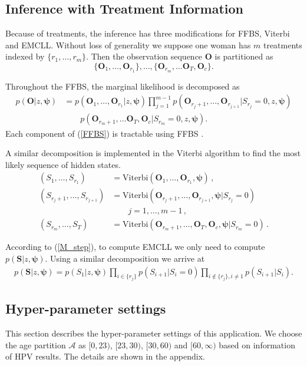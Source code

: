 \documentclass{article}
\begin{document}
\subsection{Inference with Treatment Information}
Because of treatments, the inference has three modifications for FFBS, Viterbi and EMCLL. Without loss of generality we suppose one woman has $m$ treatments indexed by $\{r_1, \ldots, r_m\}$. Then the observation sequence $\bm O$ is partitioned as 
$$\{\bm O_1, \ldots, \bm O_{r_1}\}, \ldots, \{\bm O_{r_m}, \ldots \bm O_T, \bm O_{c} \}.$$

Throughout the FFBS, the marginal likelihood is decomposed as
\begin{align}
p(\bm O |z, \bm \psi) & = p(\bm O_1, \ldots, \bm O_{r_1}| z, \bm \psi) \prod_{j = 1}^{m-1}p(\bm O_{r_j+1}, \ldots, \bm O_{r_{j+1}}| S_{r_j} = 0, z, \bm \psi) \nonumber \\
& \qquad p(\bm O_{r_m+1}, \ldots \bm O_T, \bm O_{c}| S_{r_m} = 0, z, \bm \psi). 
\label{FFBS}
\end{align}
Each component of (\ref{FFBS}) is tractable using FFBS \cite{Kitagawa_1987}.

A similar decomposition is implemented in the Viterbi algorithm to find the most likely sequence of hidden states.
\begin{align}
(S_1, \ldots, S_{r_1}) & = \mathrm{Viterbi}(\bm O_1, \ldots, \bm O_{r_1}, \bm \psi)\,, \nonumber \\
(S_{r_j+1}, \ldots, S_{r_{j+1}}) & = \mathrm{Viterbi}(\bm O_{r_j+1}, \ldots, \bm O_{r_{j+1}}, \bm \psi| S_{r_j} = 0)  \nonumber \\
& \qquad j = 1, \ldots, m-1\,,  \nonumber \\
(S_{r_m}, \ldots, S_{T}) & = \mathrm{Viterbi}(\bm O_{r_m+1}, \ldots, \bm O_{T}, \bm O_{c}, \bm \psi | S_{r_m} = 0) \,.
\end{align}

According to (\ref{M_step}), to compute EMCLL we only need to compute $p(\bm S| z, \bm{\psi})$. Using a similar decomposition we arrive at
\begin{eqnarray*}
	p(\bm S|z, \bm\psi) =  p(S_1|z, \bm \psi)\prod_{i \in \{r_j\}} p(S_{i+1}| S_i=0) \prod_{i \notin \{r_j\}, i \neq 1} p(S_{i+1}| S_i).
\end{eqnarray*}


\subsection{Hyper-parameter settings}
This section describes the hyper-parameter settings of this application. We choose the age partition $\mathcal{A}$ as $[0, 23)$, $[23,30)$, $[30,60)$ and $[60, \infty)$ based on information of HPV results. The details are shown in the appendix. 
\end{document}
